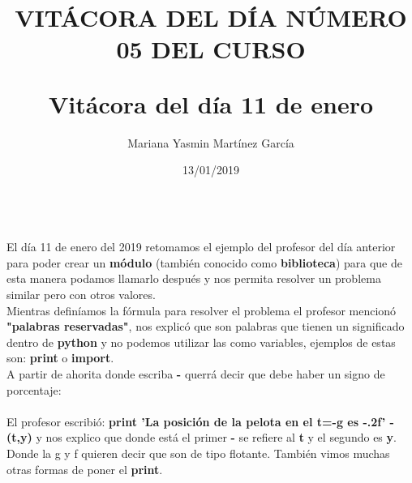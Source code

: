 \documentclass[letterpaper, 12pt, twoside]{article}
\title{\Huge\item\color{red}\textbf {VITÁCORA DEL DÍA NÚMERO 05 DEL CURSO}}
\author{Mariana Yasmin Martínez García}
\date{13/01/2019}
\begin{document}
	\maketitle
	
	\newpage
	\title{\huge\textbf{Vitácora del día 11 de enero\\}} \\
	El día 11 de enero del 2019 retomamos el ejemplo del profesor del día anterior para poder crear un \textbf{módulo} (también conocido como \textbf{biblioteca}) para que de esta manera podamos llamarlo después y nos permita resolver un problema similar pero con otros valores.\\
	Mientras definíamos la fórmula para resolver el problema el profesor  mencionó \textbf{"palabras reservadas"}, nos explicó que son palabras que tienen un significado dentro de \textbf{python} y no podemos utilizar las como variables, ejemplos de estas son: \textbf{print} o \textbf{import}. \\
	A partir de ahorita donde escriba \textbf{-} querrá decir que debe haber un signo de porcentaje:\\ \\
	El profesor escribió: \textbf{print 'La posición de la pelota en el t=-g es -.2f' - (t,y)}
	y nos explico que donde está el primer \textbf{-} se refiere al \textbf{t} y el segundo es \textbf{y}. Donde la g y f quieren decir que son de tipo flotante.
	También vimos muchas otras formas de poner el \textbf{print}. 
	
	
\end{document}
